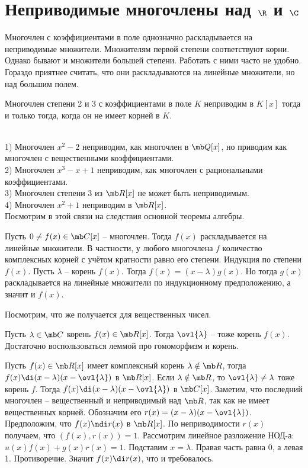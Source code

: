 \section{Неприводимые многочлены над $\R$ и $\C$}

Многочлен с коэффициентами в поле однозначно раскладывается на неприводимые множители. Множителям первой степени соответствуют корни. Однако бывают и множители большей степени. Работать с ними часто не удобно. Гораздо приятнее считать, что они раскладываются на линейные множители, но над большим полем. 

\rm Многочлен степени 2 и 3 с коэффициентами в поле $K$ неприводим в $K[x]$ тогда и только тогда, когда он не имеет корней в $K$.
\erm

\exm\\
1) Многочлен $x^2-2$ неприводим, как многочлен в $\mb Q[x]$, но приводим как многочлен с вещественными коэффициентами.\\
2) Многочлен $x^3-x+1$ неприводим, как многочлен с рациональными коэффициентами.\\
3) Многочлен степени 3 из $\mb R[x]$ не может быть неприводимым.\\
4) Многочлен $x^2+1$ неприводим в $\mb R[x]$.\\


Посмотрим в этой связи на следствия основной теоремы алгебры.

\crl Пусть $0\neq f(x) \in \mb C[x]$ -- многочлен. Тогда $f(x)$ раскладывается на линейные множители. В частности,  у любого многочлена $f$ количество комплексных корней с учётом кратности равно его степени.
\ecrl
\proof Индукция по степени $f(x)$. Пусть $\lambda$ -- корень $f(x)$. Тогда $f(x)=(x-\lambda)g(x)$. Но тогда $g(x)$ раскладывается на линейные множители по индукционному предположению, а значит и $f(x)$.
\endproof

Посмотрим, что же получается для вещественных чисел.

\lm Пусть $\lambda \in \mb C$ корень $f(x)\in \mb R[x]$. Тогда $\ovl{\lambda}$ -- тоже корень $f(x)$.
\elm 
\proof Достаточно воспользоваться леммой про гомоморфизм и корень.
\endproof

\lm Пусть $f(x)\in \mb R[x]$ имеет комплексный корень $\lambda \notin \mb R$, тогда $f(x)\di(x-\lambda)(x-\ovl{\lambda})$ в $\mb R[x]$.
\proof Если $\lambda \notin \mb R$, то $\ovl{\lambda}\neq \lambda$ тоже корень $f$. Тогда $f(x)\di(x-\lambda)(x-\ovl{\lambda})$ в $\mb C[x]$. Заметим, что последний многочлен -- вещественный и неприводимый над $\mb R$, так как не имеет вещественных корней. Обозначим его $r(x)=(x-\lambda)(x-\ovl{\lambda})$. Предположим, что $f(x)\ndi r(x)$ в $\mb R[x]$. По неприводимости $r(x)$ получаем, что $(f(x),r(x))=1$. Рассмотрим линейное разложение НОД-а: $u(x)f(x)+g(x)r(x)=1$. Подставим $x=\lambda$. Правая часть равна 0, а левая 1. Противоречие. Значит $f(x)\di r(x)$, что и требовалось. 
\endproof
\elm

